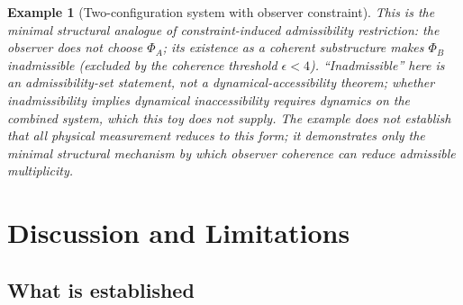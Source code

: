 \documentclass[12pt]{article}
\newtheorem{example}[theorem]{Example}
\begin{document}
\begin{example}[Two-configuration system with observer constraint]
This is the minimal structural analogue of constraint-induced admissibility restriction: the observer does not choose $\Phi_A$; its existence as a coherent substructure makes $\Phi_B$ inadmissible (excluded by the coherence threshold $\epsilon < 4$). ``Inadmissible'' here is an admissibility-set statement, not a dynamical-accessibility theorem; whether inadmissibility implies dynamical inaccessibility requires dynamics on the combined system, which this toy does not supply. The example does not establish that all physical measurement reduces to this form; it demonstrates only the minimal structural mechanism by which observer coherence can reduce admissible multiplicity.
\end{example}

\section{Discussion and Limitations}\label{sec:discussion}

\subsection{What is established}
\end{document}
